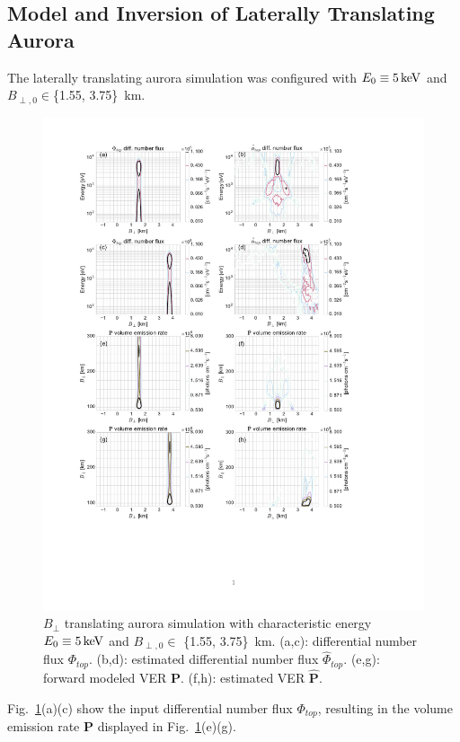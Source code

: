 \subsection{Model and Inversion of Laterally Translating Aurora}\label{sec:transverse}
The laterally translating aurora simulation was configured with $E_0\equiv \unit[5]{keV}$  and $B_{\perp,0}\in$\{1.55, 3.75\}~km. 
%
\begin{figure}
\centering
\includegraphics[trim=50 140 80 30,clip,height=0.875\textheight]{gfx/transversesim}
\caption{$B_\perp$ translating aurora simulation with characteristic energy $E_0 \equiv \unit[5]{keV}$ and $B_{\perp,0}\in$ \{1.55, 3.75\}~km. 
(a,c): differential number flux $\Phi_{top}$. (b,d): estimated differential number flux $\hat{\Phi}_{top}$. 
(e,g): forward modeled VER $\mathbf{P}$.  (f,h): estimated VER $\mathbf{\hat{P}}$.}%
\label{fig:JPB}
\end{figure}
%
Fig.~\ref{fig:JPB}(a)(c) show the input differential number flux $\Phi_{top}$, resulting in the volume emission rate $\mathbf{P}$ displayed in Fig.~\ref{fig:JPB}(e)(g). 
